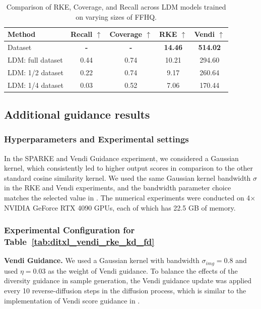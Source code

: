 \documentclass{article}
\theoremstyle{plain}
\theoremstyle{definition}
\renewcommand{\cite}{\citep}
\begin{document}
\begin{appendices}
\begin{table}[ht]
\centering
\caption{Comparison of RKE, Coverage, and Recall across LDM models trained on varying sizes of FFHQ.}
\label{tab:train_ldm_rke_vs_recall_coverage}
\begin{tabular}{lcccc}
\toprule
Method & Recall $\uparrow$ & Coverage $\uparrow$ & RKE $\uparrow$ & Vendi $\uparrow$\\
\midrule
Dataset & \textbf{-} & \textbf{-} & \textbf{14.46} & \textbf{514.02}\\
\midrule
LDM: full dataset & 0.44 & 0.74 & 10.21 & 294.60\\
LDM: 1/2 dataset & 0.22 & 0.74 & 9.17 & 260.64\\
LDM: 1/4 dataset & 0.03 & 0.52 & 7.06 & 170.44\\
\bottomrule
\end{tabular}
\end{table}


\goodbreak\newpage

\subsection{Additional guidance results}
\subsubsection{Hyperparameters and Experimental settings}
In the SPARKE and Vendi Guidance experiment, we considered a Gaussian kernel, which consistently led to higher output scores in comparison to the other standard cosine similarity kernel. We used the same Gaussian kernel bandwidth $\sigma$ in the RKE and Vendi experiments, and the bandwidth parameter choice matches the selected value in \cite{jalali2024conditional, friedman2023vendi}. The numerical experiments were conducted on 4$\times$NVIDIA GeForce RTX 4090 GPUs, each of which has 22.5 GB of memory.

\subsubsection{Experimental Configuration for Table~\ref{tab:ditxl_vendi_rke_kd_fd}}

\textbf{Vendi Guidance.} We used a Gaussian kernel with bandwidth \(\sigma_{img} = 0.8\) and used $\eta=0.03$ as the weight of Vendi guidance. To balance the effects of the diversity guidance in sample generation, the Vendi guidance update was applied every 10 reverse-diffusion steps in the diffusion process, which is similar to the implementation of Vendi score guidance in \cite{hemmat2024cvsg}.


\end{appendices}
\end{document}
